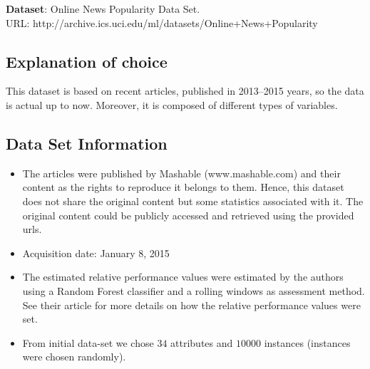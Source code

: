 \newpage
\noindent \textbf{Dataset}: Online News Popularity Data Set. \\
URL: http://archive.ics.uci.edu/ml/datasets/Online+News+Popularity

\subsection*{Explanation of choice}
This dataset is based on recent articles, published in 2013--2015 years, so the data is actual up to now.   
Moreover, it is composed of different types of variables. 

\subsection*{Data Set Information}

\begin{itemize}
\item The articles were published by Mashable (www.mashable.com) and their content as the rights to reproduce it belongs to them. Hence, this dataset does not share the original content but some statistics associated with it. The original content could be publicly accessed and retrieved using the provided urls.  
\item Acquisition date: January 8, 2015  
\item The estimated relative performance values were estimated by the authors using a Random Forest classifier and a rolling windows as assessment method. See their article for more details on how the relative performance values were set.
\item From initial data-set we chose $34$ attributes and $10000$ instances (instances were chosen randomly).
\end{itemize}


